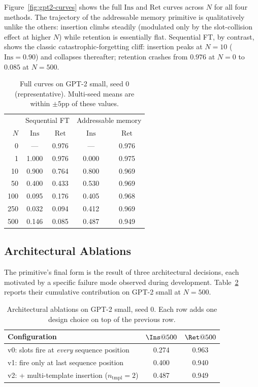 \documentclass[11pt,a4paper]{article}
\newcommand{\Ins}{\text{Ins}}
\newcommand{\Ret}{\text{Ret}}
\begin{document}
Figure~\ref{fig:gpt2-curves} shows the full $\Ins$ and $\Ret$ curves
across $N$ for all four methods. The trajectory of the addressable
memory primitive is qualitatively unlike the others: insertion climbs
steadily (modulated only by the slot-collision effect at higher $N$)
while retention is essentially flat. Sequential FT, by contrast, shows
the classic catastrophic-forgetting cliff: insertion peaks at $N = 10$
($\Ins = 0.90$) and collapses thereafter; retention crashes from
$0.976$ at $N = 0$ to $0.085$ at $N = 500$.

\begin{table}[h]
\centering
\caption{Full curves on GPT-2 small, seed 0 (representative). Multi-seed
means are within $\pm 5$pp of these values.}
\label{tab:gpt2-curves}
\begin{tabular}{rcccc}
\toprule
& \multicolumn{2}{c}{Sequential FT} & \multicolumn{2}{c}{Addressable memory} \\
$N$ & $\Ins$ & $\Ret$ & $\Ins$ & $\Ret$ \\
\midrule
0   & ---   & 0.976 & ---   & 0.976 \\
1   & 1.000 & 0.976 & 0.000 & 0.975 \\
10  & 0.900 & 0.764 & 0.800 & 0.969 \\
50  & 0.400 & 0.433 & 0.530 & 0.969 \\
100 & 0.095 & 0.176 & 0.405 & 0.968 \\
250 & 0.032 & 0.094 & 0.412 & 0.969 \\
500 & 0.146 & 0.085 & 0.487 & 0.949 \\
\bottomrule
\end{tabular}
\end{table}

\subsection{Architectural Ablations}

The primitive's final form is the result of three architectural
decisions, each motivated by a specific failure mode observed during
development. Table~\ref{tab:ablation} reports their cumulative
contribution on GPT-2 small at $N = 500$.

\begin{table}[h]
\centering
\caption{Architectural ablations on GPT-2 small, seed 0. Each row adds
one design choice on top of the previous row.}
\label{tab:ablation}
\begin{tabular}{lcc}
\toprule
\textbf{Configuration} & $\Ins@500$ & $\Ret@500$ \\
\midrule
v0: slots fire at \emph{every} sequence position & 0.274 & 0.963 \\
v1: fire only at last sequence position & 0.400 & 0.940 \\
v2: + multi-template insertion ($n_\text{tmpl} = 2$) & 0.487 & 0.949 \\
\bottomrule
\end{tabular}
\end{table}
\end{document}
